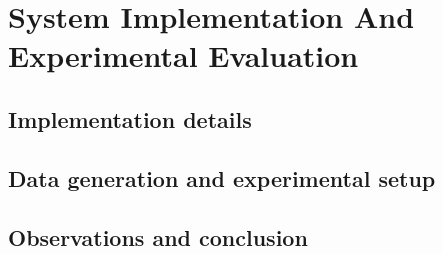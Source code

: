 \chapter{System Implementation And Experimental Evaluation}

\section{Implementation details}

\section{Data generation and experimental setup}

\section{Observations and conclusion}
